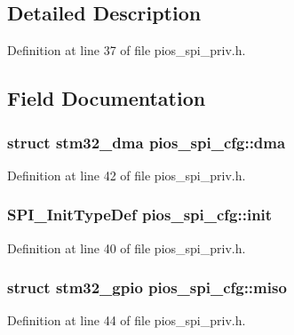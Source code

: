 \subsection{Detailed Description}


Definition at line 37 of file pios\-\_\-spi\-\_\-priv.\-h.



\subsection{Field Documentation}
\hypertarget{structpios__spi__cfg_a2facc0b31de6aa6a377366b1d1dfa30f}{
\subsubsection[{dma}]{\setlength{\rightskip}{0pt plus 5cm}struct {\bf stm32\-\_\-dma} pios\-\_\-spi\-\_\-cfg\-::dma}}\label{structpios__spi__cfg_a2facc0b31de6aa6a377366b1d1dfa30f}


Definition at line 42 of file pios\-\_\-spi\-\_\-priv.\-h.

\hypertarget{structpios__spi__cfg_adbc1199b6671cd7ab6856b5d76038020}{
\subsubsection[{init}]{\setlength{\rightskip}{0pt plus 5cm}S\-P\-I\-\_\-\-Init\-Type\-Def pios\-\_\-spi\-\_\-cfg\-::init}}\label{structpios__spi__cfg_adbc1199b6671cd7ab6856b5d76038020}


Definition at line 40 of file pios\-\_\-spi\-\_\-priv.\-h.

\hypertarget{structpios__spi__cfg_ac804df72ee895e7482167ac5452b31aa}{
\subsubsection[{miso}]{\setlength{\rightskip}{0pt plus 5cm}struct {\bf stm32\-\_\-gpio} pios\-\_\-spi\-\_\-cfg\-::miso}}\label{structpios__spi__cfg_ac804df72ee895e7482167ac5452b31aa}


Definition at line 44 of file pios\-\_\-spi\-\_\-priv.\-h.

